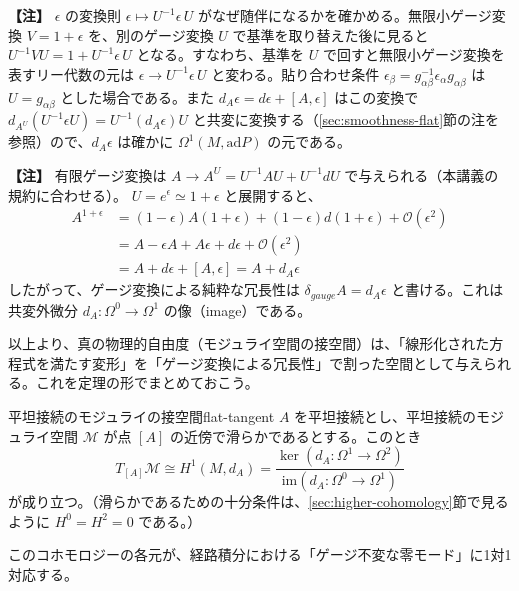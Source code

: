 \documentclass[uplatex, dvipdfmx, book]{jsbook}
\newenvironment{note}{\vspace{1ex}\par\footnotesize\noindent\textbf{【注】}}{\par\vspace{1ex}}
\begin{document}
\begin{note}
$\epsilon$ の変換則 $\epsilon \mapsto U^{-1}\epsilon\,U$ がなぜ随伴になるかを確かめる。無限小ゲージ変換 $V = 1 + \epsilon$ を、別のゲージ変換 $U$ で基準を取り替えた後に見ると $U^{-1}VU = 1 + U^{-1}\epsilon\,U$ となる。すなわち、基準を $U$ で回すと無限小ゲージ変換を表すリー代数の元は $\epsilon \to U^{-1}\epsilon\,U$ と変わる。貼り合わせ条件 $\epsilon_\beta = g_{\alpha\beta}^{-1}\epsilon_\alpha g_{\alpha\beta}$ は $U = g_{\alpha\beta}$ とした場合である。また $d_A\epsilon = d\epsilon + [A,\epsilon]$ はこの変換で $d_{A^U}(U^{-1}\epsilon U) = U^{-1}(d_A\epsilon)U$ と共変に変換する（\ref{sec:smoothness-flat}節の注を参照）ので、$d_A\epsilon$ は確かに $\Omega^1(M,\mathrm{ad}P)$ の元である。
\end{note}

\begin{note}
有限ゲージ変換は $A \to A^U = U^{-1} A U + U^{-1} d U$ で与えられる（本講義の規約に合わせる）。
$U = e^\epsilon \simeq 1 + \epsilon$ と展開すると、
\begin{align*}
A^{1+\epsilon} &= (1 - \epsilon) A (1 + \epsilon) + (1 - \epsilon) d(1 + \epsilon) + \mathcal{O}(\epsilon^2) \\
&= A - \epsilon A + A \epsilon + d\epsilon + \mathcal{O}(\epsilon^2) \\
&= A + d\epsilon + [A, \epsilon] = A + d_A \epsilon
\end{align*}
したがって、ゲージ変換による純粋な冗長性は $\delta_{gauge} A = d_A \epsilon$ と書ける。これは共変外微分 $d_A: \Omega^0 \to \Omega^1$ の像（image）である。
\end{note}

以上より、真の物理的自由度（モジュライ空間の接空間）は、「線形化された方程式を満たす変形」を「ゲージ変換による冗長性」で割った空間として与えられる。これを定理の形でまとめておこう。

\begin{mythm}{平坦接続のモジュライの接空間}{flat-tangent}
$A$ を平坦接続とし、平坦接続のモジュライ空間 $\mathcal{M}$ が点 $[A]$ の近傍で滑らかであるとする。このとき
\begin{equation*}
    T_{[A]}\mathcal{M} \cong H^1(M, d_A) = \frac{\ker (d_A: \Omega^1 \to \Omega^2)}{\mathrm{im} (d_A: \Omega^0 \to \Omega^1)}
\end{equation*}
が成り立つ。（滑らかであるための十分条件は、\ref{sec:higher-cohomology}節で見るように $H^0 = H^2 = 0$ である。）
\end{mythm}

このコホモロジーの各元が、経路積分における「ゲージ不変な零モード」に1対1対応する。
\end{document}
